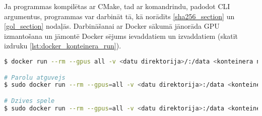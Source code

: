 Ja programmas kompilētas ar CMake, tad ar komandrindu, padodot CLI argumentus,
programmas var darbināt tā, kā norādīts \ref{sha256_section} un \ref{gol_section} nodaļās.
Darbināšanai ar Docker sākumā jānorāda  GPU izmantošana un jāmontē Docker
sējums ievaddatiem un izvaddatiem (skatīt izdruku
\ref{lst:docker_konteinera_run}).

\begin{lstlisting}[caption={Docker konteinera darbināšanas konfigurācija},
  label=lst:docker_konteinera_run,
  captionpos=b,
  language=bash
]
$ docker run --rm --gpus all -v <datu direktorija>/:/data <konteinera nosaukums> /data/<apstradajamais fails> /data/<izvada fails> <citas opcijas ...>

# Parolu atguvejs 
$ sudo docker run --rm --gpus=all -v <datu direktorija>:/data <konteinera nosaukums> /data/<parolu faila cels> /data/<paroles hash vertiba> /data<zurnalfaila cels> /data/<zurnafails>

# Dzives spele 
$ sudo docker run --rm --gpus=all -v <datu direktorija>:/data <konteinera nosaukums> /data/<ieejas rezga faila cels> /data/<izejas rezga faila cels> /data<automata solu skaits> <zurnalfaila cels> 
\end{lstlisting}
